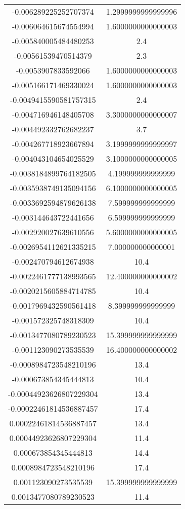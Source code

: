 \begin{table}
\begin{tabular}{S[]S[]}
-0.006289225252707374 & 1.2999999999999996\\
-0.006064615674554994 & 1.6000000000000003\\
-0.005840005484480253 & 2.4\\
-0.00561539470514379 & 2.3\\
-0.0053907833592066 & 1.6000000000000003\\
-0.005166171469330024 & 1.6000000000000003\\
-0.0049415590581757315 & 2.4\\
-0.004716946148405708 & 3.3000000000000007\\
-0.004492332762682237 & 3.7\\
-0.004267718923667894 & 3.1999999999999997\\
-0.004043104654025529 & 3.1000000000000005\\
-0.0038184899764182505 & 4.199999999999999\\
-0.0035938749135094156 & 6.1000000000000005\\
-0.0033692594879626138 & 7.599999999999999\\
-0.003144643722441656 & 6.599999999999999\\
-0.002920027639610556 & 5.6000000000000005\\
-0.0026954112621335215 & 7.000000000000001\\
-0.002470794612674938 & 10.4\\
-0.0022461777138993565 & 12.400000000000002\\
-0.0020215605884714785 & 10.4\\
-0.0017969432590561418 & 8.399999999999999\\
-0.001572325748318309 & 10.4\\
-0.0013477080789230523 & 15.399999999999999\\
-0.001123090273535539 & 16.400000000000002\\
-0.0008984723548210196 & 13.4\\
-0.000673854345444813 & 10.4\\
-0.00044923626807229304 & 13.4\\
-0.00022461814536887457 & 17.4\\
0.00022461814536887457 & 13.4\\
0.00044923626807229304 & 11.4\\
0.000673854345444813 & 14.4\\
0.0008984723548210196 & 17.4\\
0.001123090273535539 & 15.399999999999999\\
0.0013477080789230523 & 11.4\\

\end{tabular}
\end{table}
